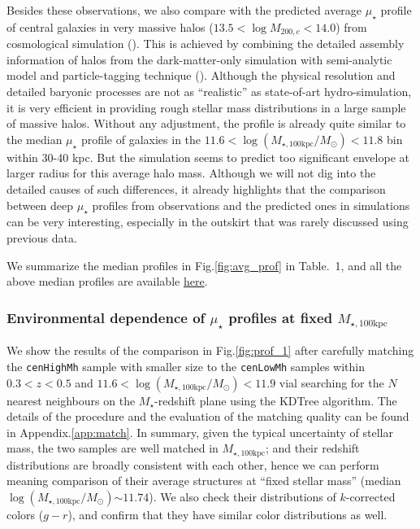\documentclass{emulateapj}
\def\rbcg{\texttt{cenHighMh}}
\def\nbcg{\texttt{cenLowMh}}
\def\mtot{{$M_{\star,100\mathrm{kpc}}$}}
\def\logmtot{{$\log (M_{\star,100\mathrm{kpc}}/M_{\odot})$}}
\def\mden{{$\mu_{\star}$}}
\newcommand{\update}[1]{\textcolor{Bittersweet}{#1}}
\begin{document}
\begin{CJK*}{UTF8}{gbsn}
    Besides these observations, we also compare with the predicted average \mden{} 
    profile of central galaxies in very massive halos 
    ($13.5 < \log M_{200,c} < 14.0$) from cosmological simulation (\citealt{Cooper13}). 
    This is achieved by combining the detailed assembly information of halos from the 
    dark-matter-only simulation with semi-analytic model and particle-tagging technique 
    (\citealt{Cooper10}).
    Although the physical resolution and detailed baryonic processes are not as 
    ``realistic'' as state-of-art hydro-simulation, it is very efficient in providing 
    rough stellar mass distributions in a large sample of massive halos. 
    Without any adjustment, the profile is already quite similar to the median \mden{}
    profile of galaxies in the $11.6 <$\logmtot{}$< 11.8$ bin within 30-40 kpc. 
    But the simulation seems to predict too significant envelope at larger radius for 
    this average halo mass. 
    Although we will not dig into the detailed causes of such differences, it already 
    highlights that the comparison between deep \mden{} profiles from observations 
    and the predicted ones in simulations can be very interesting, especially in the 
    outskirt that was rarely discussed using previous data. 
    
    We summarize the median profiles in Fig.\ref{fig:avg_prof} in Table.~1,
    and all the above median profiles are available  
    \href{https://github.com/dr-guangtou/hsc_cenHighMh/tree/master/profiles}{here}.


\subsubsection{Environmental dependence of \mden{} profiles at fixed \mtot{}}
    \label{sssec:sbp_mtot}

    \update{
    We show the results of the comparison in Fig.\ref{fig:prof_1} after 
    carefully matching the \rbcg{} sample with smaller size to the \nbcg{} samples 
    within $0.3 < z < 0.5$ and $11.6 < $\logmtot{}$<11.9$ vial searching for the $N$ 
    nearest neighbours on the $M_{\star}$-redshift plane using the KDTree algorithm. 
    The details of the procedure and the evaluation of the matching quality can be 
    found in Appendix.\ref{app:match}. 
    In summary, given the typical uncertainty of stellar mass, the two samples are well 
    matched in \mtot{}; and their redshift distributions are broadly consistent with 
    each other, hence we can perform meaning comparison of their average structures at 
    ``fixed stellar mass'' (median \logmtot{}$\sim 11.74$).    
    We also check their distributions of $k$-corrected colors ($g-r$), and confirm 
    that they have similar color distributions as well.}
    

\end{CJK*}
\end{document}
